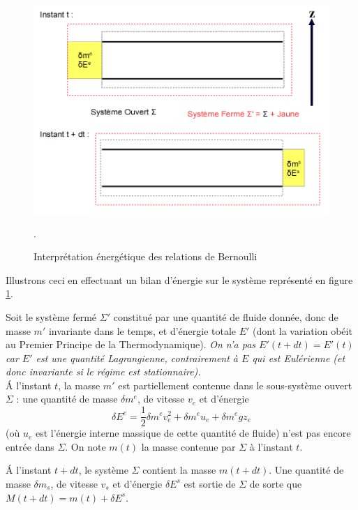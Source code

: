 \documentclass[11pt,a4paper]{report}
\begin{document}
\begin{figure}[h!]
\begin{center}
	\includegraphics[scale = 0.3]{bilan_bernoulli.png}
	\caption{Interprétation énergétique des relations de Bernoulli}. 
	\label{fig:bilan_bernoulli}
\end{center}
\end{figure}

Illustrons ceci en effectuant un bilan d'énergie sur le système représenté en figure \ref{fig:bilan_bernoulli}.

Soit le système fermé $\Sigma'$ constitué par une quantité de fluide donnée, donc de masse $m'$ invariante dans le temps, et d'énergie totale $E'$ (dont la variation obéit au Premier Principe de la Thermodynamique). \textit{On n'a pas $E'(t+dt) = E'(t)$ car $E'$ est une quantité Lagrangienne, contrairement à $E$ qui est Eulérienne (et donc invariante si le régime est stationnaire).}\\

\'A l'instant $t$, la masse $m'$ est partiellement contenue dans le sous-système ouvert $\Sigma$ : une quantité de masse $\delta m^e$, de vitesse $v_e$ et d'énergie 
\begin{equation}
	\delta E^e = \frac{1}{2}\delta m^e v_e^2 + \delta m^e u_e + \delta m^e g z_e
\end{equation}
(où $u_e$ est l'énergie interne massique de cette quantité de fluide) n'est pas encore entrée dans $\Sigma$. On note $m(t)$ la masse contenue par $\Sigma$ à l'instant $t$.

\'A l'instant $t+dt$, le système $\Sigma$ contient la masse $m(t+dt)$. Une quantité de masse $\delta m_s$, de vitesse $v_s$ et d'énergie $\delta E^s$ est sortie de $\Sigma$ de sorte que $M(t+dt) = m(t) + \delta E^s$.\\
\end{document}
